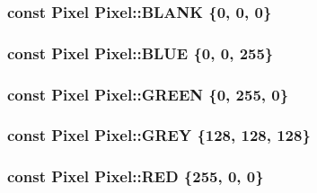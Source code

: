 \subsubsection[{\texorpdfstring{B\+L\+A\+NK}{BLANK}}]{\setlength{\rightskip}{0pt plus 5cm}const {\bf Pixel} Pixel\+::\+B\+L\+A\+NK \{0, 0, 0\}\hspace{0.3cm}{\ttfamily [static]}}\hypertarget{class_pixel_a77c8aab7dad0995df6fdc8ccf65e92ee}{}\label{class_pixel_a77c8aab7dad0995df6fdc8ccf65e92ee}
\subsubsection[{\texorpdfstring{B\+L\+UE}{BLUE}}]{\setlength{\rightskip}{0pt plus 5cm}const {\bf Pixel} Pixel\+::\+B\+L\+UE \{0, 0, 255\}\hspace{0.3cm}{\ttfamily [static]}}\hypertarget{class_pixel_a64e919862b4e618715e6d6dba7671112}{}\label{class_pixel_a64e919862b4e618715e6d6dba7671112}
\subsubsection[{\texorpdfstring{G\+R\+E\+EN}{GREEN}}]{\setlength{\rightskip}{0pt plus 5cm}const {\bf Pixel} Pixel\+::\+G\+R\+E\+EN \{0, 255, 0\}\hspace{0.3cm}{\ttfamily [static]}}\hypertarget{class_pixel_af1e95f87b82dedb916c81f427b3eb68a}{}\label{class_pixel_af1e95f87b82dedb916c81f427b3eb68a}
\subsubsection[{\texorpdfstring{G\+R\+EY}{GREY}}]{\setlength{\rightskip}{0pt plus 5cm}const {\bf Pixel} Pixel\+::\+G\+R\+EY \{128, 128, 128\}\hspace{0.3cm}{\ttfamily [static]}}\hypertarget{class_pixel_a67edde6c97818a595235295f750b50fd}{}\label{class_pixel_a67edde6c97818a595235295f750b50fd}
\subsubsection[{\texorpdfstring{R\+ED}{RED}}]{\setlength{\rightskip}{0pt plus 5cm}const {\bf Pixel} Pixel\+::\+R\+ED \{255, 0, 0\}\hspace{0.3cm}{\ttfamily [static]}}\hypertarget{class_pixel_a0873aef3100f5b2400ee7ca185bf263a}{}\label{class_pixel_a0873aef3100f5b2400ee7ca185bf263a}
